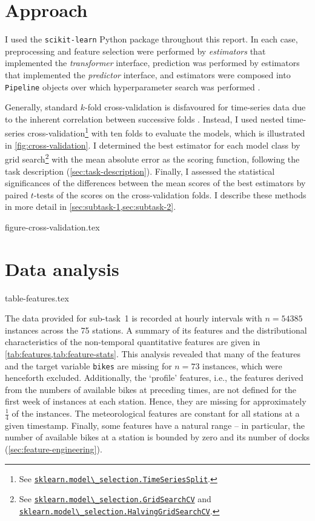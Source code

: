 \documentclass[11pt]{extarticle}
\newcommand{\sklearn}[2]{\href{https://scikit-learn.org/stable/modules/generated/sklearn.#1.#2.html}{\lstinline|sklearn.#1.#2|}}
\begin{document}
\section{Approach}
\label{sec:approach}

I used the \texttt{scikit-learn} Python package \parencite{Pedregosa2011} throughout
this report.
In each case, preprocessing and feature selection were performed by \emph{estimators}
that implemented the \emph{transformer} interface, prediction was performed by
estimators that implemented the \emph{predictor} interface, and estimators were
composed into \texttt{Pipeline} objects over which hyperparameter search was performed
\parencite[4-9]{Buitinck2013}.

Generally, standard $k$-fold cross-validation is disfavoured for time-series data due
to the inherent correlation between successive folds \parencite{Bergmeir2018}.
Instead, I used nested time-series cross-validation\footnote{See
  \sklearn{model\_selection}{TimeSeriesSplit}.
} with ten folds to evaluate the models, which is illustrated in
\cref{fig:cross-validation}.
I determined the best estimator for each model class by grid search\footnote{See
  \sklearn{model\_selection}{GridSearchCV} and
  \sklearn{model\_selection}{HalvingGridSearchCV}.
} with the mean absolute
error as the scoring function, following the task description (\cref{sec:task-description}).
Finally, I assessed the statistical significances of the differences between the mean
scores of the best estimators by paired $t$-tests of the scores on the cross-validation
folds.
I describe these methods in more detail in \cref{sec:subtask-1,sec:subtask-2}.

{figure-cross-validation.tex}

\section{Data analysis}
\label{sec:data-analysis}

{table-features.tex}

The data provided for sub-task~1 is recorded at hourly intervals with $n = 54385$
instances across the 75 stations.
A summary of its features and the distributional characteristics of the non-temporal
quantitative features are given in \cref{tab:features,tab:feature-stats}.
This analysis revealed that many of the features and the target variable \texttt{bikes}
are missing for $n = 73$ instances, which were henceforth excluded.
Additionally, the `profile' features, i.e., the features derived from the numbers of
available bikes at preceding times, are not defined for the first week of instances at
each station.
Hence, they are missing for approximately $\frac{1}{4}$ of the instances.
The meteorological features are constant for all stations at a given timestamp.
Finally, some features have a natural range -- in particular, the number of available
bikes at a station is bounded by zero and its number of docks
(\cref{sec:feature-engineering}).
\end{document}
